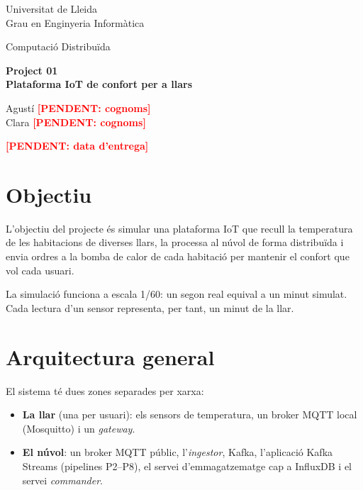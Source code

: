 \documentclass[11pt,a4paper]{article}
\newcommand{\pendent}[1]{\textcolor{red}{\textbf{[PENDENT: #1]}}}
\begin{document}
\begin{titlepage}
  \centering
  \vspace*{3cm}
  {\Large Universitat de Lleida\\[0.3cm] Grau en Enginyeria Informàtica\par}
  \vspace{1.5cm}
  {\large Computació Distribuïda\par}
  \vspace{1cm}
  {\Huge\bfseries Project 01\\[0.4cm] Plataforma IoT de confort per a llars\par}
  \vspace{2cm}
  {\large Agustí \pendent{cognoms}\\ Clara \pendent{cognoms}\par}
  \vfill
  {\large \pendent{data d'entrega}\par}
\end{titlepage}

\tableofcontents
\newpage

\section{Objectiu}

L'objectiu del projecte és simular una plataforma IoT que recull la
temperatura de les habitacions de diverses llars, la processa al núvol de
forma distribuïda i envia ordres a la bomba de calor de cada habitació per
mantenir el confort que vol cada usuari.

La simulació funciona a escala 1/60: un segon real equival a un minut simulat.
Cada lectura d'un sensor representa, per tant, un minut de la llar.

\section{Arquitectura general}

El sistema té dues zones separades per xarxa:

\begin{itemize}
  \item \textbf{La llar} (una per usuari): els sensors de temperatura, un
        broker MQTT local (Mosquitto) i un \emph{gateway}.
  \item \textbf{El núvol}: un broker MQTT públic, l'\emph{ingestor}, Kafka,
        l'aplicació Kafka Streams (pipelines P2--P8), el servei
        d'emmagatzematge cap a InfluxDB i el servei \emph{commander}.
\end{itemize}
\end{document}
